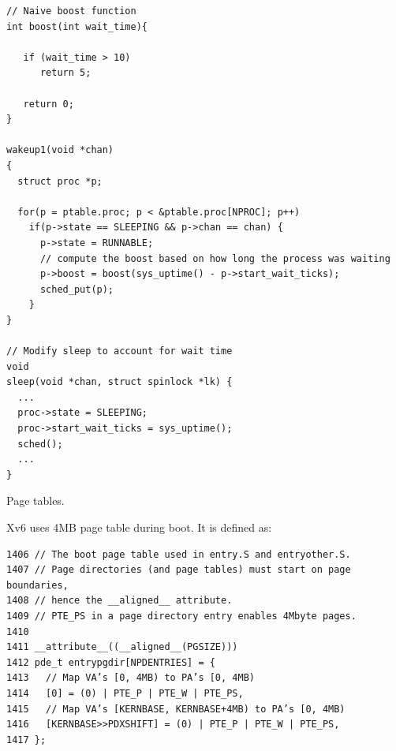 \documentclass[11pt]{exam}
\begin{document}
\begin{questions}
\begin{parts}
\begin{verbatim}
// Naive boost function
int boost(int wait_time){

   if (wait_time > 10)
      return 5;

   return 0;
}

wakeup1(void *chan)
{
  struct proc *p;

  for(p = ptable.proc; p < &ptable.proc[NPROC]; p++)
    if(p->state == SLEEPING && p->chan == chan) {
      p->state = RUNNABLE;
      // compute the boost based on how long the process was waiting
      p->boost = boost(sys_uptime() - p->start_wait_ticks);            
      sched_put(p);
    }
}

// Modify sleep to account for wait time
void
sleep(void *chan, struct spinlock *lk) {
  ...
  proc->state = SLEEPING;
  proc->start_wait_ticks = sys_uptime();
  sched();
  ...
}
\end{verbatim}


\end{parts} 


\newpage
\addpoints

\question Page tables. 


Xv6 uses 4MB page table during boot. It is defined as: 

\begin{verbatim} 
1406 // The boot page table used in entry.S and entryother.S.
1407 // Page directories (and page tables) must start on page boundaries,
1408 // hence the __aligned__ attribute.
1409 // PTE_PS in a page directory entry enables 4Mbyte pages.
1410
1411 __attribute__((__aligned__(PGSIZE)))
1412 pde_t entrypgdir[NPDENTRIES] = {
1413   // Map VA’s [0, 4MB) to PA’s [0, 4MB)
1414   [0] = (0) | PTE_P | PTE_W | PTE_PS,
1415   // Map VA’s [KERNBASE, KERNBASE+4MB) to PA’s [0, 4MB)
1416   [KERNBASE>>PDXSHIFT] = (0) | PTE_P | PTE_W | PTE_PS,
1417 };
\end{verbatim}

\end{questions}
\end{document}
